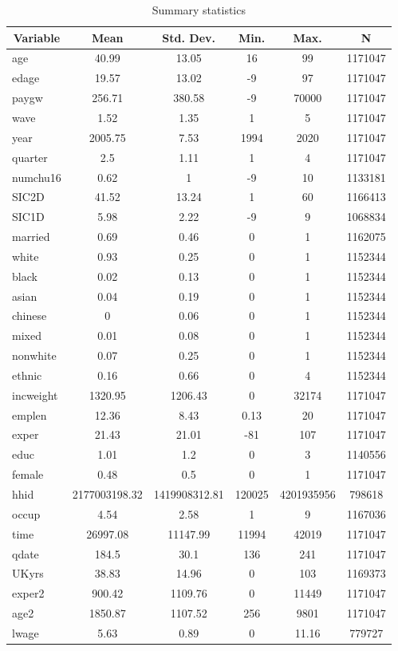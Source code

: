 
\begin{table}[htbp]\centering \caption{Summary statistics \label{sumstats}}
\begin{tabular}{l c c c c c}\hline\hline
\multicolumn{1}{c}{\textbf{Variable}} & \textbf{Mean}
 & \textbf{Std. Dev.}& \textbf{Min.} &  \textbf{Max.} & \textbf{N}\\ \hline
age & 40.99 & 13.05 & 16 & 99 & 1171047\\
edage & 19.57 & 13.02 & -9 & 97 & 1171047\\
paygw & 256.71 & 380.58 & -9 & 70000 & 1171047\\
wave & 1.52 & 1.35 & 1 & 5 & 1171047\\
year & 2005.75 & 7.53 & 1994 & 2020 & 1171047\\
quarter & 2.5 & 1.11 & 1 & 4 & 1171047\\
numchu16 & 0.62 & 1 & -9 & 10 & 1133181\\
SIC2D & 41.52 & 13.24 & 1 & 60 & 1166413\\
SIC1D & 5.98 & 2.22 & -9 & 9 & 1068834\\
married & 0.69 & 0.46 & 0 & 1 & 1162075\\
white & 0.93 & 0.25 & 0 & 1 & 1152344\\
black & 0.02 & 0.13 & 0 & 1 & 1152344\\
asian & 0.04 & 0.19 & 0 & 1 & 1152344\\
chinese & 0 & 0.06 & 0 & 1 & 1152344\\
mixed & 0.01 & 0.08 & 0 & 1 & 1152344\\
nonwhite & 0.07 & 0.25 & 0 & 1 & 1152344\\
ethnic & 0.16 & 0.66 & 0 & 4 & 1152344\\
incweight & 1320.95 & 1206.43 & 0 & 32174 & 1171047\\
emplen & 12.36 & 8.43 & 0.13 & 20 & 1171047\\
exper & 21.43 & 21.01 & -81 & 107 & 1171047\\
educ & 1.01 & 1.2 & 0 & 3 & 1140556\\
female & 0.48 & 0.5 & 0 & 1 & 1171047\\
hhid & 2177003198.32 & 1419908312.81 & 120025 & 4201935956 & 798618\\
occup & 4.54 & 2.58 & 1 & 9 & 1167036\\
time & 26997.08 & 11147.99 & 11994 & 42019 & 1171047\\
qdate & 184.5 & 30.1 & 136 & 241 & 1171047\\
UKyrs & 38.83 & 14.96 & 0 & 103 & 1169373\\
exper2 & 900.42 & 1109.76 & 0 & 11449 & 1171047\\
age2 & 1850.87 & 1107.52 & 256 & 9801 & 1171047\\
lwage & 5.63 & 0.89 & 0 & 11.16 & 779727\\
\hline\end{tabular}
\label{tab:sumstats}
\end{table}
